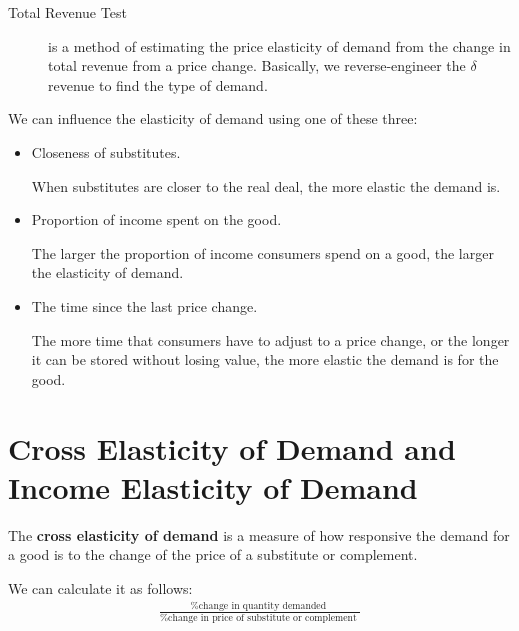                 \begin{description}
                    \item[Total Revenue Test] is a method of estimating the price elasticity of demand from the change in total revenue from a price change.
                    Basically, we reverse-engineer the $\delta$revenue to find the type of demand.
                \end{description}
                We can influence the elasticity of demand using one of these three:
                \begin{itemize}
                    \item Closeness of substitutes.

                        When substitutes are closer to the real deal, the more elastic the demand is.
                    \item Proportion of income spent on the good.

                        The larger the proportion of income consumers spend on a good, the larger the elasticity of demand.
                    \item The time since the last price change.

                        The more time that consumers have to adjust to a price change, or the longer it can be stored without losing value, the more elastic the demand is for the good.
                \end{itemize}
            \section{Cross Elasticity of Demand and Income Elasticity of Demand} %
            \label{sec:cross_elasticity_of_demand_and_income_elasticity_of_demand}

                The \textbf{cross elasticity of demand} is a measure of how responsive the demand for a good is to the change of the price of a substitute or complement.

                We can calculate it as follows:
                \begin{align*}
                    \frac{\text{
                    \% change in quantity demanded
                    }}{\text{
                    \% change in price of substitute or complement
                    }}
                \end{align*}

